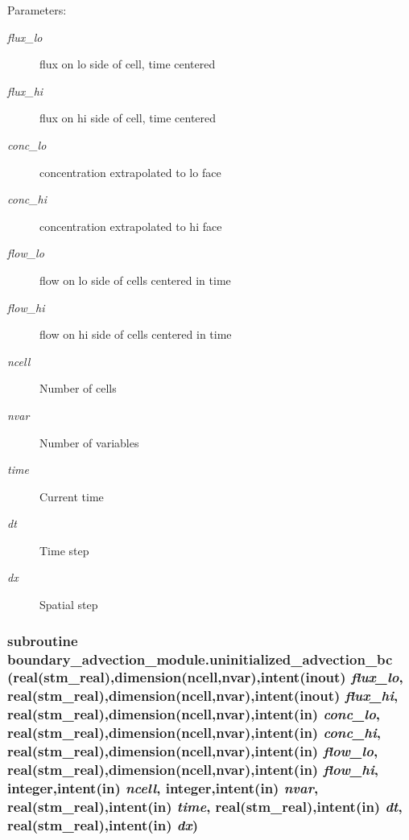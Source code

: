 \begin{Desc}
\item[Parameters:]
\begin{description}
\item[{\em flux\_\-lo}]flux on lo side of cell, time centered\item[{\em flux\_\-hi}]flux on hi side of cell, time centered\item[{\em conc\_\-lo}]concentration extrapolated to lo face\item[{\em conc\_\-hi}]concentration extrapolated to hi face\item[{\em flow\_\-lo}]flow on lo side of cells centered in time\item[{\em flow\_\-hi}]flow on hi side of cells centered in time\item[{\em ncell}]Number of cells\item[{\em nvar}]Number of variables\item[{\em time}]Current time\item[{\em dt}]Time step \item[{\em dx}]Spatial step \end{description}
\end{Desc}
\hypertarget{a00050_26eb82e9a6eae1dd87145fafd01bd2ae}{
\subsubsection[{uninitialized\_\-advection\_\-bc}]{\setlength{\rightskip}{0pt plus 5cm}subroutine boundary\_\-advection\_\-module.uninitialized\_\-advection\_\-bc (real(stm\_\-real),dimension(ncell,nvar),intent(inout) {\em flux\_\-lo}, \/  real(stm\_\-real),dimension(ncell,nvar),intent(inout) {\em flux\_\-hi}, \/  real(stm\_\-real),dimension(ncell,nvar),intent(in) {\em conc\_\-lo}, \/  real(stm\_\-real),dimension(ncell,nvar),intent(in) {\em conc\_\-hi}, \/  real(stm\_\-real),dimension(ncell,nvar),intent(in) {\em flow\_\-lo}, \/  real(stm\_\-real),dimension(ncell,nvar),intent(in) {\em flow\_\-hi}, \/  integer,intent(in) {\em ncell}, \/  integer,intent(in) {\em nvar}, \/  real(stm\_\-real),intent(in) {\em time}, \/  real(stm\_\-real),intent(in) {\em dt}, \/  real(stm\_\-real),intent(in) {\em dx})}}
\label{a00050_26eb82e9a6eae1dd87145fafd01bd2ae}


